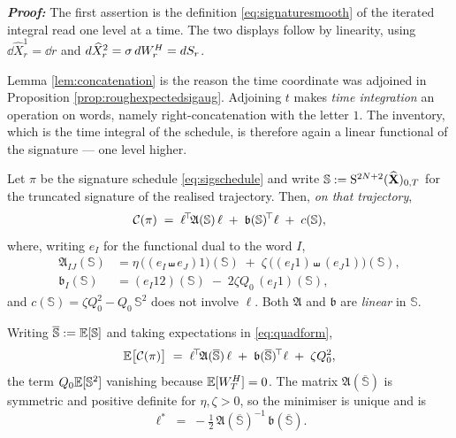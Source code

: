 \textbf{\textit{Proof:}} The first assertion is the definition \eqref{eq:signaturesmooth} of the
iterated integral read one level at a time. The two displays follow by linearity, using
$\dd\widehat X^{1}_r=\dd r$ and $d\widehat X^{2}_r=\sigma\,dW^{H}_r=dS_r$.
\qedfilledtext

\medskip

Lemma \ref{lem:concatenation} is the reason the time coordinate was adjoined in Proposition
\ref{prop:roughexpectedsigaug}. Adjoining $t$ makes \emph{time integration} an
operation on words, namely right-concatenation with the letter $1$. The inventory, which is the time
integral of the schedule, is therefore again a linear functional of the signature --- one level
higher.

\begin{proposition}\label{prop:quadform}
Let $\pi$ be the signature schedule \eqref{eq:sigschedule} and write
$\mathbb{S}:=\mathrm{S}^{2N+2}(\widehat{\mathbf{X}})_{0,T}$ for the truncated signature of the realised
trajectory. Then, \emph{on that trajectory},
\begin{equation}\label{eq:quadform}
  \mathcal{C}(\pi)\;=\;\ell^{\!\top}\!\mathfrak{A}(\mathbb{S})\,\ell\;+\;\mathfrak{b}(\mathbb{S})^{\!\top}\ell\;+\;c(\mathbb{S}),
\end{equation}
where, writing $e_I$ for the functional dual to the word $I$,
\begin{align}
  \mathfrak{A}_{IJ}(\mathbb{S}) &= \eta\,\bigl((e_I\shuffle e_J)1\bigr)(\mathbb{S})
            \;+\;\zeta\,\bigl((e_I1)\shuffle(e_J1)\bigr)(\mathbb{S}),\label{eq:Adef}\\
  \mathfrak{b}_{I}(\mathbb{S}) &= (e_I12)(\mathbb{S})\;-\;2\zeta Q_0\,(e_I1)(\mathbb{S}),\label{eq:bdef}
\end{align}
and $c(\mathbb{S})=\zeta Q_0^{2}-Q_0\,\mathbb{S}^{2}$ does not involve $\ell$. Both $\mathfrak{A}$ and
$\mathfrak{b}$ are \emph{linear} in $\mathbb{S}$.
\end{proposition}

\begin{corollary}\label{cor:quadformexpectation}
Writing $\overline{\mathbb{S}}:=\mathbb{E}[\mathbb{S}]$ and taking expectations in \eqref{eq:quadform},
\begin{equation}\label{eq:quadformE}
  \mathbb{E}\bigl[\mathcal{C}(\pi)\bigr]\;=\;\ell^{\!\top}\!\mathfrak{A}(\overline{\mathbb{S}})\,\ell
  \;+\;\mathfrak{b}(\overline{\mathbb{S}})^{\!\top}\ell\;+\;\zeta Q_0^{2},
\end{equation}
the term $Q_0\mathbb{E}[\mathbb{S}^{2}]$ vanishing because $\mathbb{E}[W^{H}_T]=0$. The matrix
$\mathfrak{A}(\overline{\mathbb{S}})$ is symmetric and positive definite for $\eta,\zeta>0$, so the minimiser is
unique and is
\begin{equation}\label{eq:optimalell}
  \ell^{*}\;=\;-\tfrac12\,\mathfrak{A}(\overline{\mathbb{S}})^{-1}\,\mathfrak{b}(\overline{\mathbb{S}}).
\end{equation}
\end{corollary}

